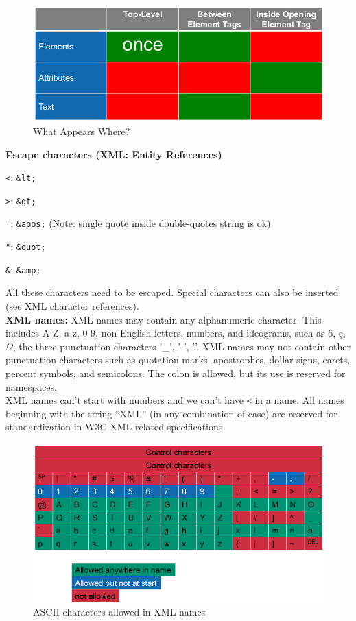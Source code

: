 \documentclass[11pt,oneside,a4paper]{article}
\begin{document}
\begin{figure}[hb!]
	\centering
	\includegraphics[width=0.4\linewidth]{figures/xml_syntax}
	\caption{What Appears Where?}
	\label{fig:xmlsyntax}
\end{figure}

\textbf{Escape characters (XML: Entity References)}

\begin{compactitem}
	\item \verb|<|: \verb|&lt;|
	\item \verb|>|: \verb|&gt;|
	\item \verb|'|: \verb|&apos;| (Note: single quote inside double-quotes string is ok)
	\item \verb|"|: \verb|&quot;|
	\item \verb|&|: \verb|&amp;|
\end{compactitem}

All these characters need to be escaped. Special characters can also be inserted (see XML character references).\\

\textbf{XML names:} XML names may contain any alphanumeric character. This includes A-Z, a-z, 0-9, non-English letters, numbers, and ideograms, such as ö, ç, $\Omega$, the  three punctuation characters '\_', '-', '.'. XML names may not contain other punctuation characters such as quotation marks, apostrophes, dollar signs, carets, percent symbols, and semicolons. The colon is allowed, but its use is reserved for namespaces.\\
XML names can't start with numbers and we can't have \verb|<| in a name. All names beginning with the string “XML” (in any combination of case) are reserved for standardization in W3C XML-related specifications.\\

\begin{figure}
	\centering
	\includegraphics[width=0.5\linewidth]{figures/xml_names}
	\caption{ASCII characters allowed in XML names}
	\label{fig:xmlnames}
\end{figure}
\end{document}
